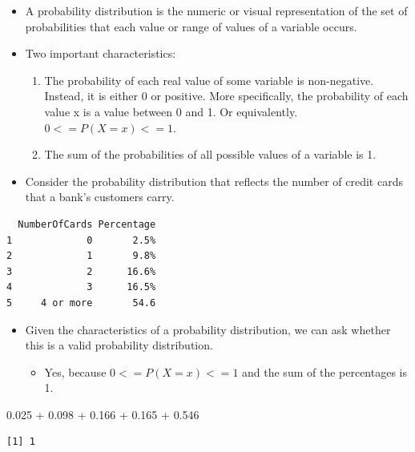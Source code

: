 \documentclass[
  letterpaper,
  DIV=11,
  numbers=noendperiod]{scrreprt}
\newenvironment{Shaded}{\begin{snugshade}}{\end{snugshade}}
\newcommand{\FloatTok}[1]{\textcolor[rgb]{0.68,0.00,0.00}{#1}}
\newcommand{\SpecialCharTok}[1]{\textcolor[rgb]{0.37,0.37,0.37}{#1}}
\providecommand{\tightlist}{%
  \setlength{\itemsep}{0pt}\setlength{\parskip}{0pt}}\usepackage{longtable,booktabs,array}
\begin{document}
\begin{itemize}
\item
  A probability distribution is the numeric or visual representation of
  the set of probabilities that each value or range of values of a
  variable occurs.
\item
  Two important characteristics:

  \begin{enumerate}
  \def\labelenumi{\arabic{enumi}.}
  \tightlist
  \item
    The probability of each real value of some variable is non-negative.
    Instead, it is either 0 or positive. More specifically, the
    probability of each value x is a value between 0 and 1. Or
    equivalently. \(0 <= P(X=x) <= 1\).
  \item
    The sum of the probabilities of all possible values of a variable is
    1.
  \end{enumerate}
\item
  Consider the probability distribution that reflects the number of
  credit cards that a bank's customers carry.
\end{itemize}

\begin{verbatim}
  NumberOfCards Percentage
1             0       2.5%
2             1       9.8%
3             2      16.6%
4             3      16.5%
5     4 or more       54.6
\end{verbatim}

\begin{itemize}
\tightlist
\item
  Given the characteristics of a probability distribution, we can ask
  whether this is a valid probability distribution.

  \begin{itemize}
  \tightlist
  \item
    Yes, because \(0 <= P(X=x) <= 1\) and the sum of the percentages is
    1.
  \end{itemize}
\end{itemize}

\begin{Shaded}
\begin{Highlighting}[]
\FloatTok{0.025} \SpecialCharTok{+} \FloatTok{0.098} \SpecialCharTok{+} \FloatTok{0.166} \SpecialCharTok{+} \FloatTok{0.165} \SpecialCharTok{+} \FloatTok{0.546}
\end{Highlighting}
\end{Shaded}

\begin{verbatim}
[1] 1
\end{verbatim}
\end{document}
